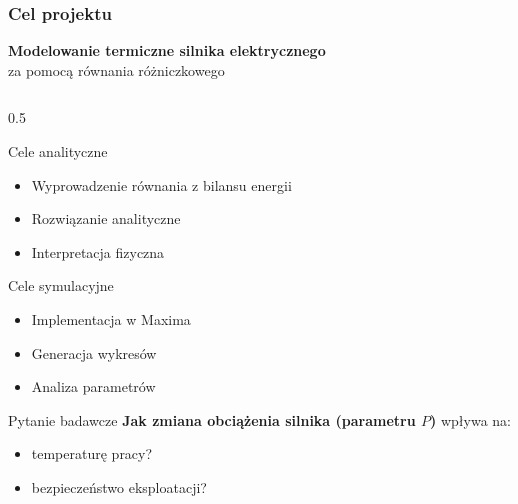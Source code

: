 \documentclass[10pt, aspectratio=169, t]{beamer}
\begin{document}
\begin{frame}
	\frametitle{Cel projektu}
	
	\begin{center}
		\textbf{Modelowanie termiczne silnika elektrycznego} \\
		za pomocą równania różniczkowego
	\end{center}
	
	\vspace{0.3cm}
	
	\begin{columns}[T]
		\begin{column}{0.5\textwidth}
			\begin{block}{Cele analityczne}
				\begin{itemize}
					\item Wyprowadzenie równania z bilansu energii
					\item Rozwiązanie analityczne
					\item Interpretacja fizyczna
				\end{itemize}
			\end{block}
			
			\begin{block}{Cele symulacyjne}
				\begin{itemize}
					\item Implementacja w Maxima
					\item Generacja wykresów
					\item Analiza parametrów
				\end{itemize}
			\end{block}
			
			\begin{exampleblock}{Pytanie badawcze}
				\textbf{Jak zmiana obciążenia silnika (parametru $P$)} wpływa na:
				\begin{itemize}
					\item temperaturę pracy?
					\item bezpieczeństwo eksploatacji?
				\end{itemize}
			\end{exampleblock}
		\end{column}
		

\end{columns}
\end{frame}
\end{document}
